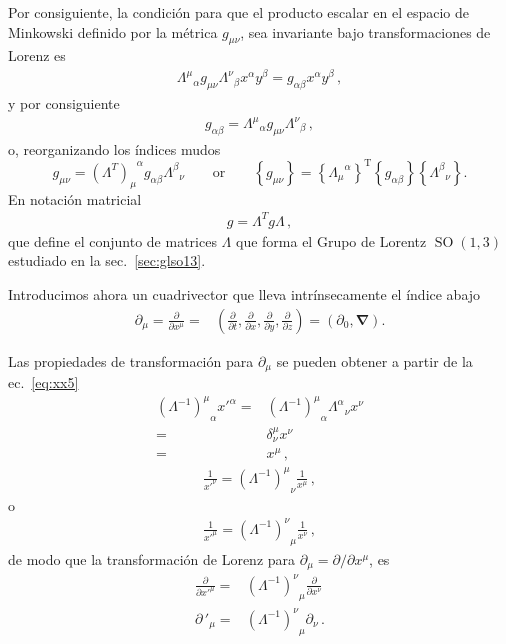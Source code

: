 \begin{frame}
Por consiguiente, la condición para que el producto escalar  en el espacio de Minkowski definido por la métrica $g_{\mu\nu}$, sea invariante bajo transformaciones de Lorenz es
\begin{align}
  {\Lambda^{\mu}}_{\alpha}g_{\mu\nu}{\Lambda^{\nu}}_{\beta}x^{\alpha}y^{\beta}=
  g_{\alpha\beta}x^{\alpha}y^{\beta}\,,
\end{align}
y por consiguiente
\begin{align}
  g_{\alpha\beta}={\Lambda^{\mu}}_{\alpha}g_{\mu\nu}{\Lambda^{\nu}}_{\beta}\,,
\end{align}
o, reorganizando los índices mudos
\begin{equation}
  \label{eq:lrinv}
  g_{\mu\nu}={(\Lambda^{T})_{\mu}}^\alpha g_{\alpha\beta}{\Lambda^\beta}_{\nu}\qquad\text{or}\qquad 
\left\{g_{\mu\nu}\right\}=\left\{{\Lambda_{\mu}}^{\alpha}\right\}^{\text{T}}\left\{g_{\alpha\beta}\right\}\left\{{\Lambda^\beta}_{\nu}\right\}.
\end{equation}
En notación matricial
\begin{align}
 g=\Lambda^T g \Lambda\,,
\end{align}
que define el conjunto de matrices $\Lambda$ que forma el Grupo de Lorentz $\operatorname{SO}(1,3)$ estudiado en la sec.~\ref{sec:glso13}.

Introducimos ahora un cuadrivector que lleva intrínsecamente el índice abajo
\begin{align}
   \partial_\mu=\frac{\partial}{\partial x^\mu}=&\left(
    \frac{\partial}{\partial t},\frac{\partial}{\partial x},\frac{\partial}{\partial y},\frac{\partial}{\partial z}
  \right)
  =(\partial_0,\boldsymbol{\nabla}).
\end{align}



Las propiedades de transformación para $\partial_\mu$ se pueden obtener a partir de la ec.~\eqref{eq:xx5}
\begin{align}
  {\left(\Lambda^{-1}\right)^\mu}_\alpha{x'}^\alpha=&{\left(\Lambda^{-1}\right)^\mu}_\alpha{\Lambda^\alpha}_\nu x^\nu\nonumber\\
=&\delta^\mu_\nu x^\nu\nonumber\\
=&x^\mu\,,
\end{align}
\begin{align}
  \frac{1}{{x'}^\nu}= {\left(\Lambda^{-1}\right)^\mu}_\nu\frac{1}{x^\mu}\,,
\end{align}
o
\begin{align}
  \label{eq:183qft}
    \frac{1}{{x'}^\mu}= {\left(\Lambda^{-1}\right)^\nu}_\mu\frac{1}{x^\nu}\,,
\end{align}
de modo que la transformación de Lorenz para $\partial_\mu=\partial/\partial x^\mu$, es
\begin{align}
  \label{eq:dmulrtran}
   \frac{\partial}{{\partial x'}^\mu}=& {\left(\Lambda^{-1}\right)^\nu}_\mu\frac{\partial}{\partial x^\nu}\nonumber\\
   {\partial\,}'_\mu=& {\left(\Lambda^{-1}\right)^\nu}_\mu\partial_\nu\,.
\end{align}


\end{frame}
